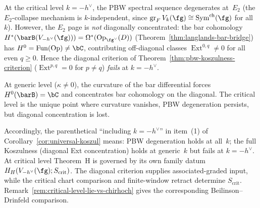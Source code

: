 \begin{remark}
\label{rem:pbw-vs-diagonal-critical}
At the critical level $k = -h^\vee$, the PBW spectral sequence
degenerates at~$E_2$ (the $E_2$-collapse mechanism is
$k$-independent, since $\operatorname{gr}_F V_k(\fg) \cong
\operatorname{Sym}^{\mathrm{ch}}(\fg)$ for all~$k$).
However, the $E_2$ page is \emph{not} diagonally concentrated:
the bar cohomology
$H^*(\barB(V_{-h^\vee}(\fg))) = \Omega^*(\mathrm{Op}_{\fg^\vee}(D))$
\textup{(}Theorem~\textup{\ref{thm:langlands-bar-bridge}}\textup{)}
has $H^0 = \operatorname{Fun}(\mathrm{Op}) \neq \bC$,
contributing off-diagonal classes
$\operatorname{Ext}^{0,q} \neq 0$ for all even $q \geq 0$.
Hence the diagonal criterion of
Theorem~\textup{\ref{thm:pbw-koszulness-criterion}}
\textup{(}$\operatorname{Ext}^{p,q} = 0$ for
$p \neq q$\textup{)} \emph{fails} at $k = -h^\vee$.

At generic level ($\kappa \neq 0$), the curvature of the bar
differential forces $H^0(\barB) = \bC$ and concentrates bar
cohomology on the diagonal. The critical level is the unique
point where curvature vanishes, PBW degeneration persists, but
diagonal concentration is lost.

Accordingly, the parenthetical ``including $k = -h^\vee$'' in
item~(1) of
Corollary~\textup{\ref{cor:universal-koszul}}
means: PBW degeneration holds at all~$k$;
the full Koszulness
\textup{(}diagonal Ext concentration\textup{)}
holds at generic~$k$
but fails at $k = -h^\vee$.
At critical level Theorem~H is governed by its own family datum
$H_H(V_{-h^\vee}(\fg);S_{\mathrm{crit}})$.  The diagonal criterion
supplies associated-graded input, while the critical chart comparison
and finite-window retract determine $S_{\mathrm{crit}}$.
Remark~\textup{\ref{rem:critical-level-lie-vs-chirhoch}} gives the
corresponding Beilinson--Drinfeld comparison.
\end{remark}

